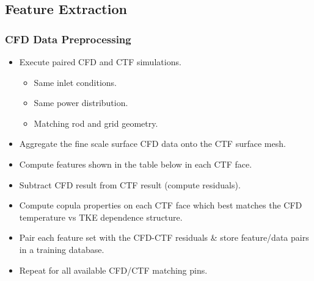 \documentclass[t, pdftex]{beamer}
\begin{document}
\subsection*{Feature Extraction}
\begin{frame}[shrink=20]
\frametitle{CFD Data Preprocessing}
\vspace{-20pt}
\begin{itemize}
    \item Execute paired CFD and CTF simulations.
    \begin{itemize}
        \item Same inlet conditions.
        \item Same power distribution.
        \item Matching rod and grid geometry.
    \end{itemize}
    \item Aggregate the fine scale surface CFD data onto the CTF surface mesh.
    \item Compute features shown in the table below in each CTF face.
    \item Subtract CFD result from CTF result (compute residuals).
    \item Compute copula properties on each CTF face which best matches the CFD temperature vs TKE dependence structure.
    \item Pair each feature set with the CFD-CTF residuals \& store feature/data pairs in a training database.
    \item Repeat for all available CFD/CTF matching pins.
\end{itemize}
\vspace{-20pt}
\begin{table}[h]
    \begin{center}
        

\end{center}
\end{table}
\end{frame}
\end{document}
